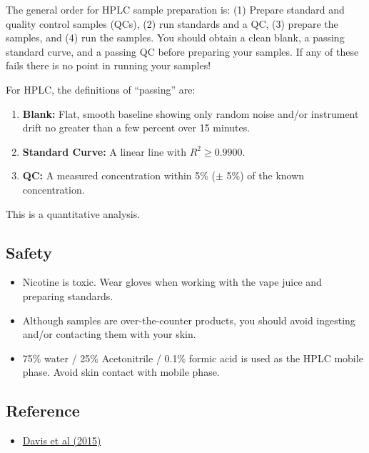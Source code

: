 \documentclass[]{tufte-book}
\providecommand{\tightlist}{%
  \setlength{\itemsep}{0pt}\setlength{\parskip}{0pt}}
\begin{document}
The general order for HPLC sample preparation is: (1) Prepare standard and quality control samples (QCs), (2) run standards and a QC, (3) prepare the samples, and (4) run the samples. You should obtain a clean blank, a passing standard curve, and a passing QC before preparing your samples. If any of these fails there is no point in running your samples!

For HPLC, the definitions of ``passing'' are:

\begin{enumerate}
\def\labelenumi{\arabic{enumi}.}
\tightlist
\item
  \textbf{Blank:} Flat, smooth baseline showing only random noise and/or instrument drift no greater than a few percent over 15 minutes.\\
\item
  \textbf{Standard Curve:} A linear line with \(R^2 \ge 0.9900\).\\
\item
  \textbf{QC:} A measured concentration within 5\% (\(\pm\) 5\%) of the known concentration.
\end{enumerate}

This is a quantitative analysis.

\hypertarget{safety-3}{%
\subsection*{Safety}\label{safety-3}}

\begin{itemize}
\tightlist
\item
  Nicotine is toxic. Wear gloves when working with the vape juice and preparing standards.\\
\item
  Although samples are over-the-counter products, you should avoid ingesting and/or contacting them with your skin.
\item
  75\% water / 25\% Acetonitrile / 0.1\% formic acid is used as the HPLC mobile phase. Avoid skin contact with mobile phase.
\end{itemize}

\hypertarget{reference}{%
\subsection*{Reference}\label{reference}}

\begin{itemize}
\tightlist
\item
  \href{https://www.ncbi.nlm.nih.gov/pmc/articles/PMC4892702/}{Davis et al (2015)}
\end{itemize}
\end{document}
